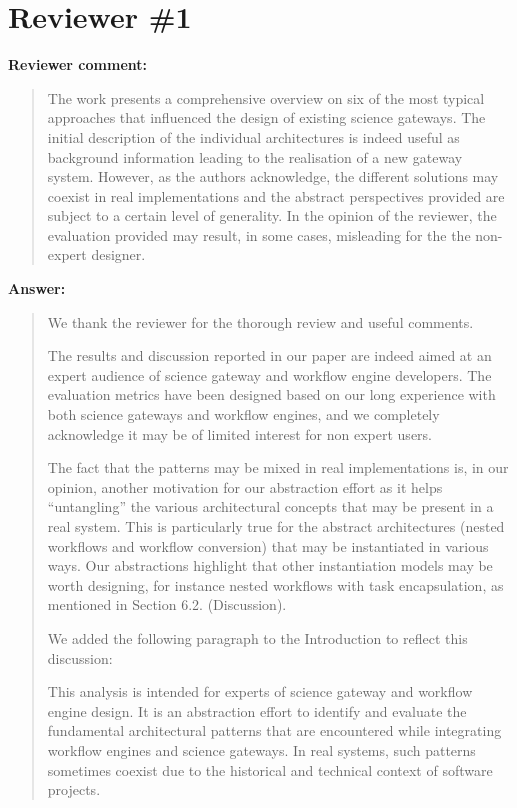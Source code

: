 \documentclass[a4]{article}
\newenvironment{review}%
{\textbf{Reviewer comment:}\begin{quote}}%
{\end{quote}}%
\newenvironment{answer}%
{\textbf{Answer:}\begin{small}\begin{quote}}%
{\end{quote}\end{small}}%
\newcommand{\revised}[1]{\color{blue} #1\color{black}\xspace}
\begin{document}
\section{Reviewer \#1}

\begin{review}
  The work presents a comprehensive overview on six of the most
  typical approaches that influenced the design of existing science
  gateways. The initial description of the individual architectures is
  indeed useful as background information leading to the realisation
  of a new gateway system. However, as the authors acknowledge, the
  different solutions may coexist in real implementations and the
  abstract perspectives provided are subject to a certain level of
  generality. In the opinion of the reviewer, the evaluation provided
  may result, in some cases, misleading for the the non-expert
  designer.
\end{review}

\begin{answer}

  We thank the reviewer for the thorough review and useful comments.

  The results and discussion reported in our paper are indeed aimed at
  an expert audience of science gateway and workflow engine
  developers. The evaluation metrics have been designed based on our
  long experience with both science gateways and workflow engines, and
  we completely acknowledge it may be of limited interest for non
  expert users.

  The fact that the patterns may be mixed in real implementations is,
  in our opinion, another motivation for our abstraction effort as it
  helps ``untangling'' the various architectural concepts that may be
  present in a real system. This is particularly true for the abstract
  architectures (nested workflows and workflow conversion) that may be
  instantiated in various ways. Our abstractions highlight that other
  instantiation models may be worth designing, for instance nested
  workflows with task encapsulation, as mentioned in Section 6.2. (Discussion).

  We added the following paragraph to the Introduction to reflect this discussion:

\revised{This analysis is intended for experts of science gateway
  and workflow engine design. It is an abstraction effort to identify
  and evaluate the fundamental architectural patterns that are
  encountered while integrating workflow engines and science gateways.
  In real systems, such patterns sometimes coexist due to the
  historical and technical context of software projects.}

\end{answer}
\end{document}
